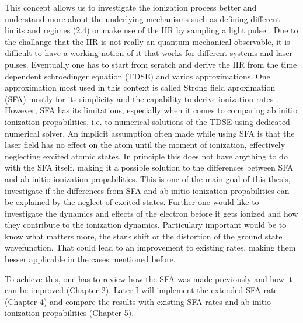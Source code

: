 This concept allows us to investigate the ionization process better and understand more about the underlying mechanisms such as defining different limits and regimes (2.4) or make use of the IIR by sampling a light pulse \cite{Park:18}.
Due to the challange that the IIR is not really an quantum mechanical observable, it is difficult to have a working notion of it that works for different systems and laser pulses.
Eventually one has to start from scratch and derive  the IIR from the time dependent schroedinger equation (TDSE) and varios approximations.
One approximation most used in this context is called Strong field aproximation (SFA) mostly for its simplicity and the capability to derive ionization rates \cite{Theory_NPS}.
However, SFA has its limitations, especially when it comes to comparing ab initio ionization propabilities, i.e. to numerical solutions of the TDSE using dedicated numerical solver.
An implicit assumption often made while using SFA is that the laser field has no effect on the atom until the moment of ionization, effectively neglecting excited atomic states.
In principle this does not have anything to do with the SFA itself, making it a possible solution to the differences between SFA and ab initio ionization propabilities.
This is one of the main goal of this thesis, investigate if the differences from SFA and ab initio ionization propabilities can be explained by the neglect of excited states.
Further one would like to investigate the dynamics and effects of the electron before it gets ionized and how they contribute to the ionization dynamics.
Particulary important would be to know what matters more, the stark shift or the distortion of the ground state wavefunction.
That could lead to an improvement to existing rates, making them besser applicable in the cases mentioned before.

To achieve this, one has to review how the SFA was made previously and how it can be improved (Chapter 2).
Later I will implement the extended SFA rate (Chapter 4) and compare the results with existing SFA rates and ab initio ionization propabilities (Chapter 5).







